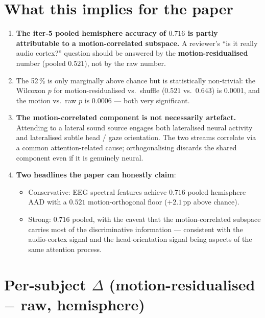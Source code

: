 \section{What this implies for the paper}

\begin{enumerate}
  \item \textbf{The iter-5 pooled hemisphere accuracy of $0.716$ is
        partly attributable to a motion-correlated subspace.} A
        reviewer's ``is it really audio cortex?'' question should be
        answered by the \textbf{motion-residualised} number (pooled
        $0.521$), not by the raw number.
  \item The 52\,\% is only marginally above chance but is statistically
        non-trivial: the Wilcoxon $p$ for motion-residualised vs.\
        shuffle ($0.521$ vs.\ $0.643$) is 0.0001, and the motion vs.\
        raw $p$ is 0.0006 --- both very significant.
  \item \textbf{The motion-correlated component is not necessarily
        artefact.} Attending to a lateral sound source engages both
        lateralised neural activity and lateralised subtle head /
        gaze orientation. The two streams correlate via a common
        attention-related cause; orthogonalising discards the shared
        component even if it is genuinely neural.
  \item \textbf{Two headlines the paper can honestly claim}:
  \begin{itemize}
    \item Conservative: EEG spectral features achieve
          $0.716$ pooled hemisphere AAD with a $0.521$ motion-orthogonal
          floor ($+2.1$\,pp above chance).
    \item Strong: $0.716$ pooled, with the caveat that the
          motion-correlated subspace carries most of the discriminative
          information --- consistent with the audio-cortex signal and
          the head-orientation signal being aspects of the same
          attention process.
  \end{itemize}
\end{enumerate}

\section{Per-subject $\Delta$ (motion-residualised $-$ raw, hemisphere)}

